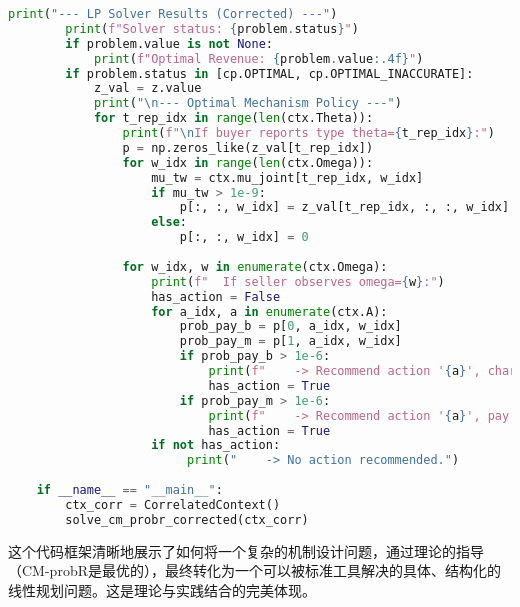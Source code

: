 \begin{lstlisting}[language=Python,style=pythonstyle]
        print("--- LP Solver Results (Corrected) ---")
        print(f"Solver status: {problem.status}")
        if problem.value is not None:
            print(f"Optimal Revenue: {problem.value:.4f}")
        if problem.status in [cp.OPTIMAL, cp.OPTIMAL_INACCURATE]:
            z_val = z.value
            print("\n--- Optimal Mechanism Policy ---")
            for t_rep_idx in range(len(ctx.Theta)):
                print(f"\nIf buyer reports type theta={t_rep_idx}:")
                p = np.zeros_like(z_val[t_rep_idx])
                for w_idx in range(len(ctx.Omega)):
                    mu_tw = ctx.mu_joint[t_rep_idx, w_idx]
                    if mu_tw > 1e-9:
                        p[:, :, w_idx] = z_val[t_rep_idx, :, :, w_idx] / mu_tw
                    else: 
                        p[:, :, w_idx] = 0
    
                for w_idx, w in enumerate(ctx.Omega):
                    print(f"  If seller observes omega={w}:")
                    has_action = False
                    for a_idx, a in enumerate(ctx.A):
                        prob_pay_b = p[0, a_idx, w_idx]
                        prob_pay_m = p[1, a_idx, w_idx]
                        if prob_pay_b > 1e-6:
                            print(f"    -> Recommend action '{a}', charge {ctx.b} (Prob: {prob_pay_b:.2f})")
                            has_action = True
                        if prob_pay_m > 1e-6:
                            print(f"    -> Recommend action '{a}', pay back {ctx.M} (Prob: {prob_pay_m:.2f})")
                            has_action = True
                    if not has_action:
                         print("    -> No action recommended.")
  
    if __name__ == "__main__":
        ctx_corr = CorrelatedContext()
        solve_cm_probr_corrected(ctx_corr)    
\end{lstlisting}

这个代码框架清晰地展示了如何将一个复杂的机制设计问题，通过理论的指导（CM-probR是最优的），最终转化为一个可以被标准工具解决的具体、结构化的线性规划问题。这是理论与实践结合的完美体现。